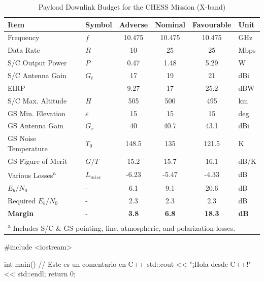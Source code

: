 \begin{table}[htbp]
\centering
\caption{Payload Downlink Budget for the CHESS Mission (X-band)}
\renewcommand{\arraystretch}{1.2}
\begin{tabular}{l l c c c l}
\toprule
\textbf{Item} & \textbf{Symbol} & \textbf{Adverse} & \textbf{Nominal} & \textbf{Favourable} & \textbf{Unit} \\
\midrule
Frequency & $f$ & 10.475 & 10.475 & 10.475 & GHz \\
Data Rate & $R$ & 10 & 25 & 25 & Mbps \\
S/C Output Power & $P$ & 0.47 & 1.48 & 5.29 & W \\
S/C Antenna Gain & $G_t$ & 17 & 19 & 21 & dBi \\
EIRP & - & 9.27 & 17 & 25.2 & dBW \\
S/C Max. Altitude & $H$ & 505 & 500 & 495 & km \\
GS Min. Elevation & $\varepsilon$ & 15 & 15 & 15 & deg \\
GS Antenna Gain & $G_r$ & 40 & 40.7 & 43.1 & dBi \\
GS Noise Temperature & $T_0$ & 148.5 & 135 & 121.5 & K \\
GS Figure of Merit & $G/T$ & 15.2 & 15.7 & 16.1 & dB/K \\
Various Losses\textsuperscript{a} & $L_{misc}$ & -6.23 & -5.47 & -4.33 & dB \\
\midrule
$E_b/N_0$ & - & 6.1 & 9.1 & 20.6 & dB \\
Required $E_b/N_0$ & - & 2.3 & 2.3 & 2.3 & dB \\
\textbf{Margin} & - & \textbf{3.8} & \textbf{6.8} & \textbf{18.3} & \textbf{dB} \\
\bottomrule
\multicolumn{6}{l}{\footnotesize \textsuperscript{a} Includes S/C \& GS pointing, line, atmospheric, and polarization losses.}
\end{tabular}
\end{table}


\begin{cpp}
#include <iostream>

int main() {
    // Este es un comentario en C++
    std::cout << "¡Hola desde C++!" << std::endl;
    return 0;
}
\end{cpp}